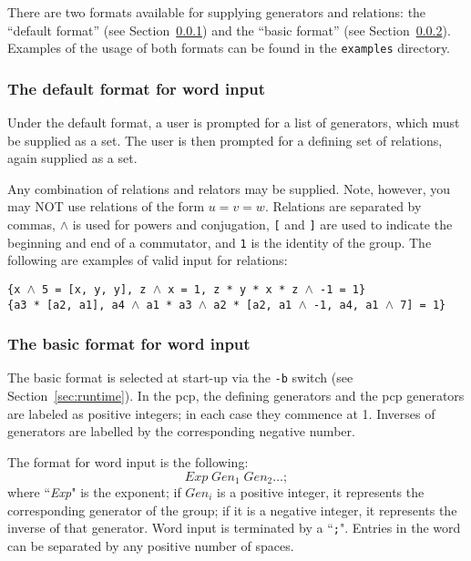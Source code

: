 \documentclass[12pt]{article}
\begin{document}
There are two formats available for supplying
generators and relations: the ``default format'' 
(see Section~\ref{sec:def-fmt}) and the ``basic format''
(see Section~\ref{sec:basic-fmt}).  Examples of the usage of both formats 
can be found in the \texttt{examples} directory.

\subsubsection{The default format for word input}\label{sec:def-fmt}
Under the default format, a user is prompted for a list of 
generators, which must be supplied as a set.
The user is then prompted for a defining set of relations,
again supplied as a set.

Any combination of relations and relators may be supplied. 
Note, however, you may NOT use relations of the form $u = v = w$.
Relations are separated by commas, $\wedge$ is used for powers and 
conjugation, \texttt{[} and \texttt{]} are used to indicate the beginning
and end of a commutator, and \texttt{1} is the identity of the group.  
The following are examples of valid input for relations:
\newcommand{\wedg}{$\mathtt{\wedge}$}
\begin{flushleft}
\quad\verb|{x |{\wedg}\verb| 5 = [x, y, y], z |{\wedg}\verb| x = 1, z * y * x * z |{\wedg}\verb| -1 = 1}|\\
\quad\verb|{a3 * [a2, a1], a4 |{\wedg}\verb| a1 * a3 |{\wedg}\verb| a2 * [a2, a1 |{\wedg}\verb| -1, a4, a1 |{\wedg}\verb| 7] = 1}|
\end{flushleft}

\subsubsection{The basic format for word input}\label{sec:basic-fmt}
The basic format is selected at start-up via the \texttt{-b} switch
(see Section~\ref{sec:runtime}).
In the pcp, the defining generators and the pcp generators are 
labeled as positive integers; in each case they commence at 1.
Inverses of generators are labelled by the corresponding negative number.

The format for word input is the following:
\begin{displaymath}
\textit{Exp}\; \textit{Gen}_1\; \textit{Gen}_2 \ldots \mathtt{;}
\end{displaymath}
where ``\textit{Exp}" is the exponent;
if $\textit{Gen}_i$ is a positive integer, it represents the corresponding
generator of the group; if it is a negative integer, it represents
the inverse of that generator.  Word input is terminated by a ``\texttt{;}". 
Entries in the word can be separated by any positive 
number of spaces.
\end{document}
